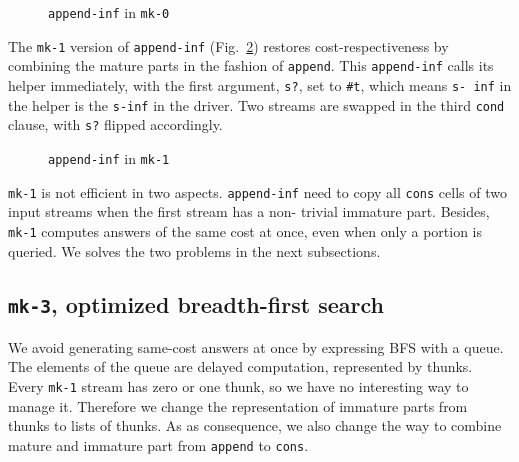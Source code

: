 \documentclass[format=acmlarge, review=true, authordraft=true]{acmart}
\begin{document}
\begin{figure}
	 	
	 \caption{\texttt{append-inf} in \texttt{mk-0}}
	 \label{append-inf-0}
\end{figure}

The \texttt{mk-1} version of \texttt{append-inf} (Fig.~\ref{append-inf-1}) 
restores cost-respectiveness by combining the mature parts in the fashion of 
\texttt{append}. This \texttt{append-inf} calls its helper immediately, with 
the first argument, \texttt{s?}, set to \texttt{\#{}t}, which means \texttt{s-
inf} in the helper is the \texttt{s-inf} in the driver. Two streams are swapped 
in the third \texttt{cond} clause, with \texttt{s?} flipped accordingly.

\begin{figure}
	 	
	 \caption{\texttt{append-inf} in \texttt{mk-1}}
	 \label{append-inf-1}
\end{figure}

\texttt{mk-1} is not efficient in two aspects. \texttt{append-inf} need to copy 
all \texttt{cons} cells of two input streams when the first stream has a non-
trivial immature part. Besides, \texttt{mk-1} computes answers of the same cost 
at once, even when only a portion is queried. We solves the two problems in the 
next subsections.

\subsection{\texttt{mk-3}, optimized breadth-first search}

We avoid generating same-cost answers at once by expressing BFS with a queue. 
The elements of the queue are delayed computation, represented by thunks. Every 
\texttt{mk-1} stream has zero or one thunk, so we have no interesting way to 
manage it. Therefore we change the representation of immature parts from thunks 
to lists of thunks. As as consequence, we also change the way to combine mature 
and immature part from \texttt{append} to \texttt{cons}. 
\end{document}
